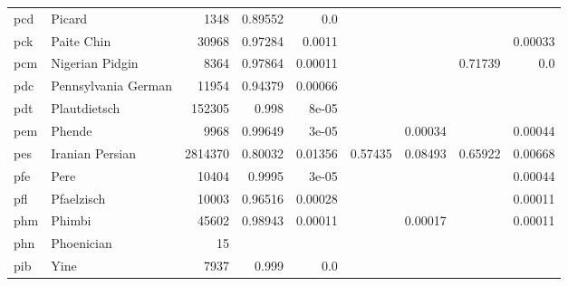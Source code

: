 \documentclass[11pt]{article}
\begin{document}
\begin{table*}[h]
{\begin{tabular}{llrrrrrrr}
pcd         & Picard         & 1348         & 0.89552         & 0.0         &          &          &          &          \\

pck         & Paite Chin         & 30968         & 0.97284         & 0.0011         &          &          &          & 0.00033         \\

pcm         & Nigerian Pidgin         & 8364         & 0.97864         & 0.00011         &          &          & 0.71739         & 0.0         \\

pdc         & Pennsylvania German         & 11954         & 0.94379         & 0.00066         &          &          &          &          \\

pdt         & Plautdietsch         & 152305         & 0.998         & 8e-05         &          &          &          &          \\

pem         & Phende         & 9968         & 0.99649         & 3e-05         &          & 0.00034         &          & 0.00044         \\

pes         & Iranian Persian         & 2814370         & 0.80032         & 0.01356         & 0.57435         & 0.08493         & 0.65922         & 0.00668         \\

pfe         & Pere         & 10404         & 0.9995         & 3e-05         &          &          &          & 0.00044         \\

pfl         & Pfaelzisch         & 10003         & 0.96516         & 0.00028         &          &          &          & 0.00011         \\

phm         & Phimbi         & 45602         & 0.98943         & 0.00011         &          & 0.00017         &          & 0.00011         \\

phn         & Phoenician         & 15         &          &          &          &          &          &          \\

pib         & Yine         & 7937         & 0.999         & 0.0         &          &          &          &          \\


\end{tabular}}
\end{table*}
\end{document}
